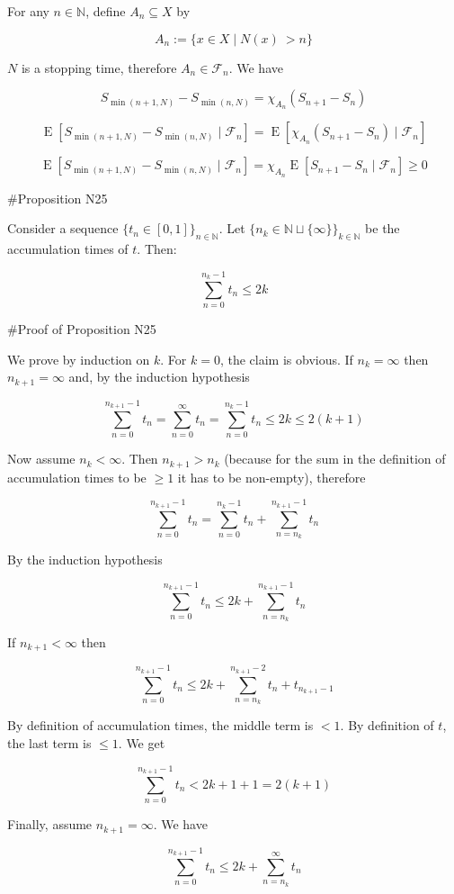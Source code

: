 \documentclass[a4paper]{article}
\DeclareMathOperator{\E}{E}
\newcommand{\Nats}{\mathbb{N}}
\newcommand{\F}{\mathcal{F}}
\begin{document}
For any ${n \in \Nats}$, define ${A_n \subseteq X}$ by

$$A_n:=\{x \in X \mid N(x)\ > n\}$$

${N}$ is a stopping time, therefore ${A_n \in \F_n}$. We have 

$${S_{\min(n+1,N)} - S_{\min(n,N)} = \chi_{A_n} (S_{n+1} - S_n)}$$

$${\E[S_{\min(n+1,N)} - S_{\min(n,N)} \mid \F_n] = \E[\chi_{A_n} (S_{n+1} - S_n) \mid \F_n]}$$

$${\E[S_{\min(n+1,N)} - S_{\min(n,N)} \mid \F_n] = \chi_{A_n} \E[ S_{n+1} - S_n \mid \F_n] \geq 0}$$

\#Proposition N25

Consider a sequence ${\{t_n \in [0,1]\}_{n \in \Nats}}$. Let ${\{n_k \in \Nats \sqcup \{\infty\}\}_{k \in \Nats}}$ be the accumulation times of ${t}$. Then:

$$\sum_{n = 0}^{n_k - 1} t_n \leq 2k$$

\#Proof of Proposition N25

We prove by induction on ${k}$. For ${k = 0}$, the claim is obvious. If ${n_k = \infty}$ then ${n_{k+1}=\infty}$ and, by the induction hypothesis

$$\sum_{n = 0}^{n_{k+1} - 1} t_n = \sum_{n = 0}^{\infty} t_n = \sum_{n = 0}^{n_k - 1} t_n \leq 2k \leq 2(k+1)$$

Now assume ${n_k < \infty}$. Then ${n_{k+1} > n_k}$ (because for the sum in the definition of accumulation times to be ${\geq 1}$ it has to be non-empty), therefore

$$\sum_{n = 0}^{n_{k+1} - 1} t_n = \sum_{n = 0}^{n_k - 1} t_n + \sum_{n = n_k}^{n_{k+1} - 1} t_n$$

By the induction hypothesis

$$\sum_{n = 0}^{n_{k+1} - 1} t_n \leq 2k + \sum_{n = n_k}^{n_{k+1} - 1} t_n$$

If ${n_{k+1} < \infty}$ then

$$\sum_{n = 0}^{n_{k+1} - 1} t_n \leq 2k + \sum_{n = n_k}^{n_{k+1} - 2} t_n + t_{n_{k+1}-1}$$

By definition of accumulation times, the middle term is ${< 1}$. By definition of ${t}$, the last term is ${\leq 1}$. We get

$$\sum_{n = 0}^{n_{k+1} - 1} t_n < 2k + 1 + 1 = 2(k+1)$$

Finally, assume ${n_{k+1} = \infty}$. We have

$$\sum_{n = 0}^{n_{k+1} - 1} t_n \leq 2k + \sum_{n = n_k}^{\infty} t_n$$
\end{document}
